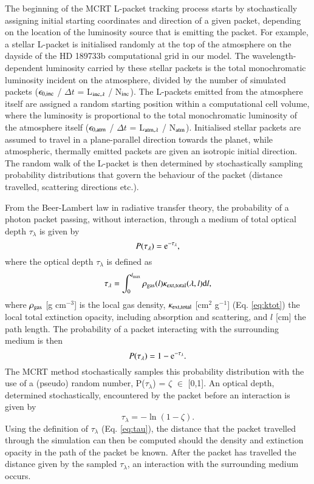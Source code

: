 \documentclass{aa}
\begin{document}
The beginning of the MCRT L-packet tracking process starts by stochastically assigning initial starting coordinates and direction of a given packet, depending on the location of the luminosity source that is emitting the packet.
For example, a stellar L-packet is initialised randomly at the top of the atmosphere on the dayside of the HD 189733b computational grid in our model.
The wavelength-dependent luminosity carried by these stellar packets is the total monochromatic luminosity incident on the atmosphere, divided by the number of simulated packets ($\epsilon_{\rm 0, inc}$ / $\Delta t$ = L$_{\rm inc, \lambda}$ / N$_{\rm inc}$).
The L-packets emitted from the atmosphere itself are assigned a random starting position within a computational cell volume, where the luminosity is proportional to the total monochromatic luminosity of the atmosphere itself ($\epsilon_{\rm 0, atm}$ / $\Delta t$ = L$_{\rm atm, \lambda}$ / N$_{\rm atm}$).
Initialised stellar packets are assumed to travel in a plane-parallel direction towards the planet, while atmospheric, thermally emitted packets are given an isotropic initial direction. 
The random walk of the L-packet is then determined by stochastically sampling probability distributions that govern the behaviour of the packet (distance travelled, scattering directions etc.). 

From the Beer-Lambert law in radiative transfer theory, the probability of a photon packet passing, without interaction, through a medium of total optical depth $\tau_{\lambda}$ is given by
\begin{equation}
 P(\tau_{\lambda}) = \rm{e}^{-\tau_{\lambda}} ,
\end{equation}
where the optical depth $\tau_{\lambda}$ is defined as 
\begin{equation}
 \tau_{\lambda} = \int^{l_{\rm max}}_{0}\rho_{\rm gas}(l)\kappa_{\rm ext, total}(\lambda, l)\textrm{d}l,
 \label{eq:tau}
\end{equation}
where $\rho_{\rm gas}$ [g cm$^{-3}$] is the local gas density, $\kappa_{\rm ext, total}$ [cm$^{2}$ g$^{-1}$] (Eq. \ref{eq:ktot}) the local total extinction opacity, including absorption and scattering, and $l$ [cm] the path length.
The probability of a packet interacting with the surrounding medium is then
\begin{equation}
 P(\tau_{\lambda}) = 1 - \rm{e}^{-\tau_{\lambda}}.
\end{equation}
The MCRT method stochastically samples this probability distribution with the use of a (pseudo) random number, P($\tau_{\lambda}$) =  $\zeta$ $\in$ [0,1]. 
An optical depth, determined stochastically, encountered by the packet before an interaction is given by
\begin{equation}
\label{eq:tausamp}
 \tau_{\lambda} = -\ln(1 - \zeta).
\end{equation}
Using the definition of $\tau_{\lambda}$ (Eq. \ref{eq:tau}), the distance that the packet travelled through the simulation can then be computed should the density and extinction opacity in the path of the packet be known.
After the packet has travelled the distance given by the sampled $\tau_{\lambda}$, an interaction with the surrounding medium occurs.
\end{document}
